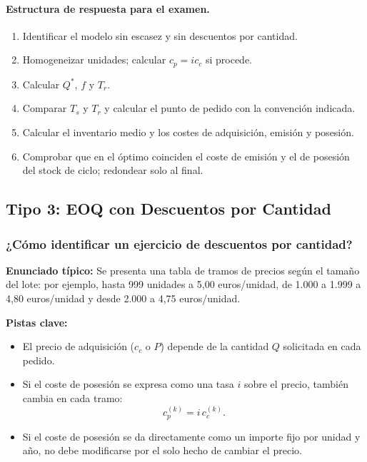 \documentclass[11pt,a4paper]{article}
\begin{document}
\paragraph{Estructura de respuesta para el examen.}
\begin{enumerate}
    \item Identificar el modelo sin escasez y sin descuentos por cantidad.
    \item Homogeneizar unidades; calcular $c_p=i c_c$ si procede.
    \item Calcular $Q^{*}$, $f$ y $T_r$.
    \item Comparar $T_s$ y $T_r$ y calcular el punto de pedido con la convención indicada.
    \item Calcular el inventario medio y los costes de adquisición, emisión y posesión.
    \item Comprobar que en el óptimo coinciden el coste de emisión y el de posesión del stock de ciclo; redondear solo al final.
\end{enumerate}


\clearpage
\subsection{Tipo 3: EOQ con Descuentos por Cantidad}

\subsubsection{¿Cómo identificar un ejercicio de descuentos por cantidad?}
\textbf{Enunciado típico:} Se presenta una tabla de tramos de precios según el tamaño del lote: por ejemplo, hasta 999 unidades a 5,00 euros/unidad, de 1.000 a 1.999 a 4,80 euros/unidad y desde 2.000 a 4,75 euros/unidad.

\textbf{Pistas clave:}
\begin{itemize}
    \item El precio de adquisición ($c_c$ o $P$) depende de la cantidad $Q$ solicitada en cada pedido.
    \item Si el coste de posesión se expresa como una tasa $i$ sobre el precio, también cambia en cada tramo:
          \[
              c_p^{(k)}=i\,c_c^{(k)}.
          \]
    \item Si el coste de posesión se da directamente como un importe fijo por unidad y año, no debe modificarse por el solo hecho de cambiar el precio.
\end{itemize}
\end{document}

